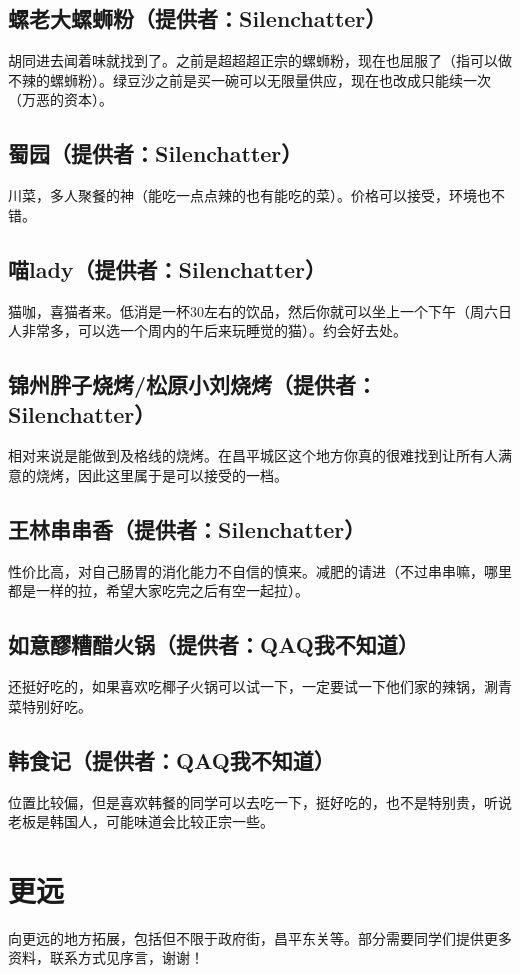 \documentclass[lang=cn,color=blue,12pt,scheme=chinese,chinesefont=nofont]{elegantbook}
\begin{document}
\subsection{螺老大螺蛳粉（提供者：Silenchatter）}
胡同进去闻着味就找到了。之前是超超超正宗的螺蛳粉，现在也屈服了（指可以做不辣的螺蛳粉）。绿豆沙之前是买一碗可以无限量供应，现在也改成只能续一次（万恶的资本）。

\subsection{蜀园（提供者：Silenchatter）}
川菜，多人聚餐的神（能吃一点点辣的也有能吃的菜）。价格可以接受，环境也不错。

\subsection{喵lady（提供者：Silenchatter）}
猫咖，喜猫者来。低消是一杯30左右的饮品，然后你就可以坐上一个下午（周六日人非常多，可以选一个周内的午后来玩睡觉的猫）。约会好去处。

\subsection{锦州胖子烧烤/松原小刘烧烤（提供者：Silenchatter）}
相对来说是能做到及格线的烧烤。在昌平城区这个地方你真的很难找到让所有人满意的烧烤，因此这里属于是可以接受的一档。

\subsection{王林串串香（提供者：Silenchatter）}
性价比高，对自己肠胃的消化能力不自信的慎来。减肥的请进（不过串串嘛，哪里都是一样的拉，希望大家吃完之后有空一起拉）。

\subsection{如意醪糟醋火锅（提供者：QAQ我不知道）}
还挺好吃的，如果喜欢吃椰子火锅可以试一下，一定要试一下他们家的辣锅，涮青菜特别好吃。

\subsection{韩食记（提供者：QAQ我不知道）}
位置比较偏，但是喜欢韩餐的同学可以去吃一下，挺好吃的，也不是特别贵，听说老板是韩国人，可能味道会比较正宗一些。

\section{更远}
\setlength{\parindent}{2em}
向更远的地方拓展，包括但不限于政府街，昌平东关等。部分需要同学们提供更多资料，联系方式见序言，谢谢！
\end{document}
